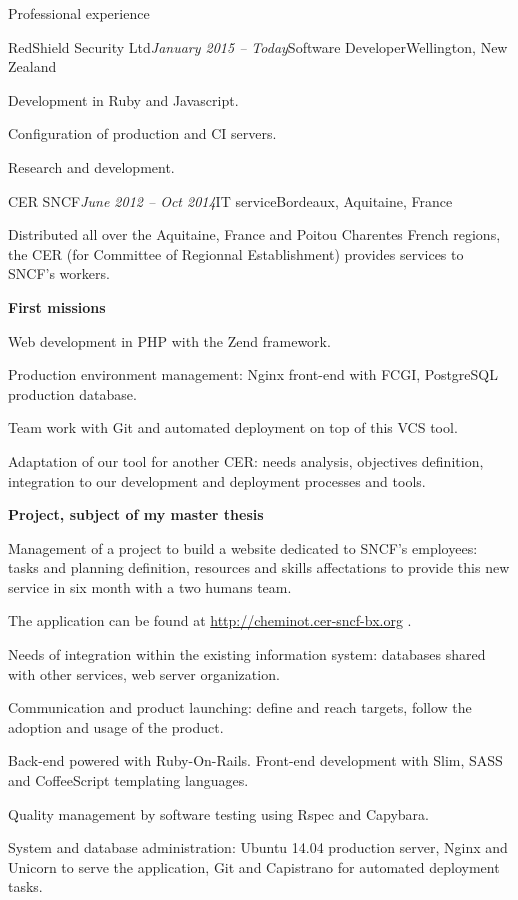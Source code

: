 \begin{rSection}{Professional experience}

  \begin{rSubsection}{RedShield Security Ltd}{\em January 2015 -- Today}{Software Developer}{Wellington, New Zealand}
    \item[] Development in Ruby and Javascript.
    \item[] Configuration of production and CI servers.
    \item[] Research and development.
  \end{rSubsection}



  \begin{rSubsection}{CER SNCF}{\em June 2012 -- Oct 2014}{IT service}{Bordeaux, Aquitaine, France}
    \item[] Distributed all over the Aquitaine, France and Poitou Charentes French regions, the CER (for Committee of Regionnal Establishment) provides services to SNCF's workers.

    \textbf{First missions}
      \item Web development in PHP with the Zend framework.
      \item Production environment management: Nginx front-end with FCGI, PostgreSQL production database.
      \item Team work with Git and automated deployment on top of this VCS tool.
      \item Adaptation of our tool for another CER: needs analysis, objectives definition, integration to our development and deployment processes and tools.

    \textbf{Project, subject of my master thesis}
      \item Management of a project to build a website dedicated to SNCF's employees: tasks and planning definition, resources and skills affectations to provide this new service in six month with a two humans team.
      \item The application can be found at \href{http://cheminot.cer-sncf-bx.org}{http://cheminot.cer-sncf-bx.org} .
      \item Needs of integration within the existing information system: databases shared with other services, web server organization.
      \item Communication and product launching: define and reach targets, follow the adoption and usage of the product.
      \item Back-end powered with Ruby-On-Rails. Front-end development with Slim, SASS and CoffeeScript templating languages.
      \item Quality management by software testing using Rspec and Capybara.
      \item System and database administration: Ubuntu 14.04 production server, Nginx and Unicorn to serve the application, Git and Capistrano for automated deployment tasks.


\end{rSubsection}
\end{rSection}

